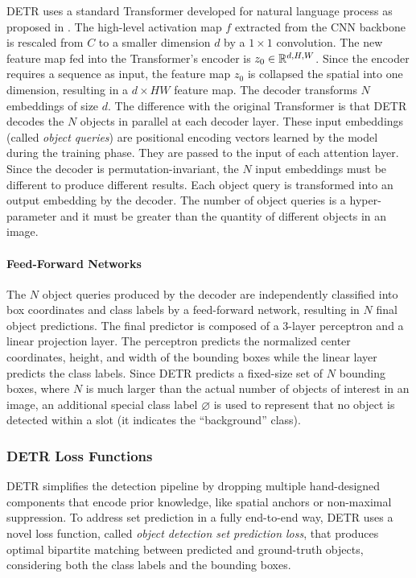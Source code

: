 DETR \cite{detr} uses a standard Transformer developed for natural language process as proposed in \cite{transformer}. The high-level activation map $f$ extracted from the CNN backbone is rescaled from $C$ to a smaller dimension $d$ by a $1\times1$ convolution. The new feature map fed into the Transformer's encoder is $z_0 \in \mathbb{R}^{d, H, W}$. Since the encoder requires a sequence as input, the feature map $z_0$ is collapsed the spatial into one dimension, resulting in a $d\times HW$ feature map. The decoder transforms $N$ embeddings of size $d$.  The difference with the original Transformer \cite{transformer} is that DETR decodes the $N$ objects in parallel at each decoder layer. These input embeddings (called \textit{object queries}) are positional encoding vectors learned by the model during the training phase. They are passed to the input of each attention layer. Since the decoder is permutation-invariant, the $N$ input embeddings must be different to produce different results. Each object query is transformed into an output embedding by the decoder. The number of object queries is a hyper-parameter and it must be greater than the quantity of different objects in an image.

\paragraph{Feed-Forward Networks} The $N$ object queries produced by the decoder are  independently classified into box coordinates and class labels by
a feed-forward network, resulting in $N$ final object predictions. The final predictor is composed of a 3-layer perceptron and a linear projection layer. The perceptron predicts the normalized center coordinates, height, and width of the bounding boxes while the linear layer predicts the class labels. Since DETR predicts a
fixed-size set of $N$ bounding boxes, where $N$ is much larger than the
actual number of objects of interest in an image, an additional special class label $\varnothing$ is used to represent that no object is detected within a slot (it indicates the ``background'' class).

\subsubsection{DETR Loss Functions}
\label{sec:detrlosses}

DETR \cite{detr} simplifies the detection pipeline by dropping multiple hand-designed components that encode prior knowledge, like spatial anchors or non-maximal suppression. To address set prediction in a fully end-to-end way, DETR uses a novel loss function, called \textit{object detection set prediction loss}, that produces
optimal bipartite matching between predicted and ground-truth objects, considering both the class labels and the bounding boxes.

